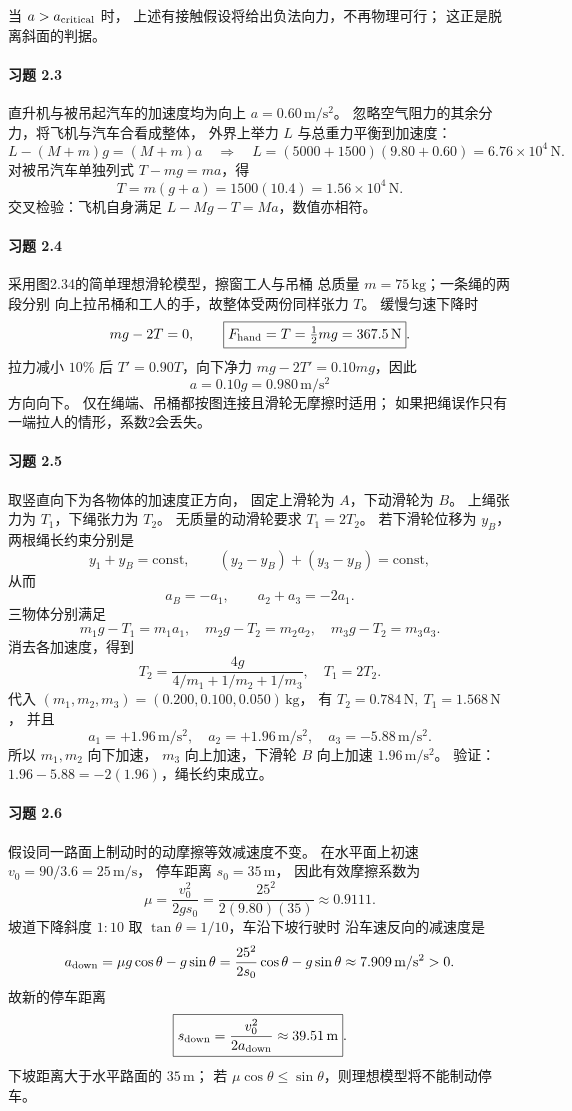 当 \(a>a_{\rm critical}\) 时，
上述有接触假设将给出负法向力，不再物理可行；
这正是脱离斜面的判据。

\paragraph{习题 2.3}
直升机与被吊起汽车的加速度均为向上
\(a=0.60\,\mathrm{m/s^2}\)。
忽略空气阻力的其余分力，将飞机与汽车合看成整体，
外界上举力 \(L\) 与总重力平衡到加速度：
\[
 L-(M+m)g=(M+m)a
 \quad\Rightarrow\quad
 \boxed{L=(5000+1500)(9.80+0.60)=6.76\times10^4\,\mathrm N}.
\]
对被吊汽车单独列式
\(T-mg=ma\)，得
\[
 \boxed{T=m(g+a)=1500(10.4)
 =1.56\times10^4\,\mathrm N}.
\]
交叉检验：飞机自身满足
\(L-Mg-T=Ma\)，数值亦相符。

\paragraph{习题 2.4}
采用图2.34的简单理想滑轮模型，擦窗工人与吊桶
总质量 \(m=75\,\mathrm{kg}\)；一条绳的两段分别
向上拉吊桶和工人的手，故整体受两份同样张力 \(T\)。
缓慢匀速下降时
\[
 mg-2T=0,\qquad
 \boxed{F_{\rm hand}=T=\tfrac12mg
 =367.5\,\mathrm N}.
\]
拉力减小 \(10\%\) 后
\(T'=0.90T\)，向下净力
\(mg-2T'=0.10mg\)，因此
\[
 \boxed{a=0.10g=0.980\,\mathrm{m/s^2}}
\]
方向向下。
仅在绳端、吊桶都按图连接且滑轮无摩擦时适用；
如果把绳误作只有一端拉人的情形，系数2会丢失。

\paragraph{习题 2.5}
取竖直向下为各物体的加速度正方向，
固定上滑轮为 \(A\)，下动滑轮为 \(B\)。
上绳张力为 \(T_1\)，下绳张力为 \(T_2\)。
无质量的动滑轮要求
\(T_1=2T_2\)。
若下滑轮位移为 \(y_B\)，两根绳长约束分别是
\[
 y_1+y_B=\mathrm{const},\qquad
 (y_2-y_B)+(y_3-y_B)=\mathrm{const},
\]
从而
\[
 a_B=-a_1,\qquad a_2+a_3=-2a_1.
\]
三物体分别满足
\[
 m_1g-T_1=m_1a_1,\quad
 m_2g-T_2=m_2a_2,\quad
 m_3g-T_2=m_3a_3.
\]
消去各加速度，得到
\[
 \boxed{T_2=\frac{4g}{4/m_1+1/m_2+1/m_3}},\quad
 \boxed{T_1=2T_2}.
\]
代入 \((m_1,m_2,m_3)=(0.200,0.100,0.050)\,\mathrm{kg}\)，
有 \(T_2=0.784\,\mathrm N,\ T_1=1.568\,\mathrm N\)，
并且
\[
 \boxed{a_1=+1.96\,\mathrm{m/s^2},\quad
 a_2=+1.96\,\mathrm{m/s^2},\quad
 a_3=-5.88\,\mathrm{m/s^2}}.
\]
所以 \(m_1,m_2\) 向下加速，
\(m_3\) 向上加速，下滑轮 \(B\) 向上加速
\(1.96\,\mathrm{m/s^2}\)。
验证：\(1.96-5.88=-2(1.96)\)，绳长约束成立。

\paragraph{习题 2.6}
假设同一路面上制动时的动摩擦等效减速度不变。
在水平面上初速
\(v_0=90/3.6=25\,\mathrm{m/s}\)，
停车距离 \(s_0=35\,\mathrm m\)，
因此有效摩擦系数为
\[
 \mu=\frac{v_0^2}{2gs_0}
 =\frac{25^2}{2(9.80)(35)}
 \approx0.9111.
\]
坡道下降斜度 \(1:10\) 取
\(\tan\theta=1/10\)，车沿下坡行驶时
沿车速反向的减速度是
\[
 a_{\rm down}
 =\mu g\cos\theta-g\sin\theta
 =\frac{25^2}{2s_0}\cos\theta-g\sin\theta
 \approx7.909\,\mathrm{m/s^2}>0.
\]
故新的停车距离
\[
 \boxed{s_{\rm down}=\frac{v_0^2}{2a_{\rm down}}
 \approx39.51\,\mathrm m}.
\]
下坡距离大于水平路面的 \(35\,\mathrm m\)；
若 \(\mu\cos\theta\le\sin\theta\)，则理想模型将不能制动停车。

